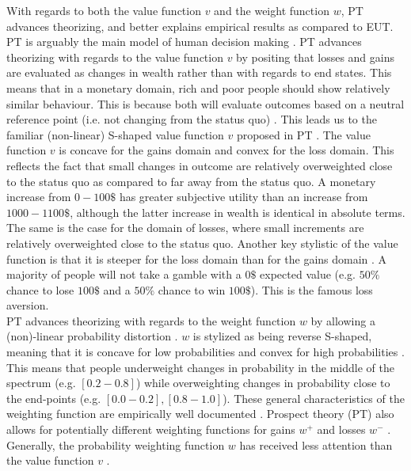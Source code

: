\documentclass[12pt]{article}
\begin{document}
With regards to both the value function $v$ and
the weight function $w$,
PT \autocite{
	PT,
tversky1992advances} advances theorizing,
and better explains empirical results
\autocite{abdellaoui2010separating,
wu1996curvature} as compared to EUT.
PT is arguably the main model of human decision making
\autocite{newell2015straight}.
PT advances theorizing
with regards to the value function $v$
by positing that losses and
gains are evaluated as changes in wealth rather
than with regards to end states. This means that
in a monetary domain, rich and poor people
should show relatively similar
behaviour. This is because both will
evaluate outcomes based
on a neutral reference point (i.e. not
changing from the status quo)
\autocite{newell2015straight,
abdellaoui2010separating}.
This leads us to the familiar (non-linear) S-shaped
value function $v$ proposed in PT \autocite{PT}.
The value function $v$ is concave for the gains
domain and convex for the loss domain.
This reflects the
fact that small changes in outcome are relatively
overweighted close to the status quo as
compared to far away from the status quo.
A monetary increase from
$0 - 100\$$ has greater subjective utility
than an increase
from $1000 - 1100\$$, although the latter
increase in wealth is identical in absolute terms.
The same is the case for the
domain of losses, where small increments are
relatively overweighted close to the
status quo. Another key stylistic of the
value function is that it is steeper for the
loss domain than for the gains domain
\autocite{newell2015straight}.
A majority of people will not take a gamble
with a $0\$$ expected value (e.g.  $50\%$ chance
to lose  $100\$$ and a  $50\%$ chance to win
$100\$$). This is the famous loss aversion. \\

PT advances theorizing with regards to
the weight function $w$
by allowing a (non)-linear probability
distortion \autocite{PT,
gonzalez1999shape}. $w$ is stylized as
being reverse S-shaped, meaning that it is
concave for low probabilities and convex for
high probabilities \autocite{gonzalez1999shape,
wu1996curvature}.
This means that
people underweight changes in probability in
the middle of the spectrum (e.g. $[0.2-0.8]$)
while overweighting changes in probability close
to the end-points (e.g. $[0.0 - 0.2], [0.8 - 1.0]$).
These general characteristics of the weighting
function are empirically well documented
\autocite{tversky1992advances,
wu1996curvature,
abdellaoui2010separating}.
Prospect theory (PT) also allows for potentially
different weighting functions for gains $w^{+}$
and losses  $w^{-}$ \autocite{abdellaoui2010separating}.
Generally, the probability weighting function $w$
has received less attention than the value function
$v$ \autocite{gonzalez1999shape}.
\end{document}
